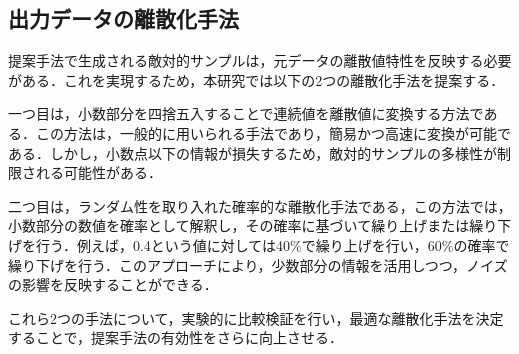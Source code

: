 \subsection{出力データの離散化手法}
提案手法で生成される敵対的サンプルは，元データの離散値特性を反映する必要がある．これを実現するため，本研究では以下の2つの離散化手法を提案する．

一つ目は，小数部分を四捨五入することで連続値を離散値に変換する方法である．この方法は，一般的に用いられる手法であり，簡易かつ高速に変換が可能である．しかし，小数点以下の情報が損失するため，敵対的サンプルの多様性が制限される可能性がある．

二つ目は，ランダム性を取り入れた確率的な離散化手法である，この方法では，小数部分の数値を確率として解釈し，その確率に基づいて繰り上げまたは繰り下げを行う．例えば，0.4という値に対しては40\%で繰り上げを行い，60\%の確率で繰り下げを行う．このアプローチにより，少数部分の情報を活用しつつ，ノイズの影響を反映することができる．

これら2つの手法について，実験的に比較検証を行い，最適な離散化手法を決定することで，提案手法の有効性をさらに向上させる．